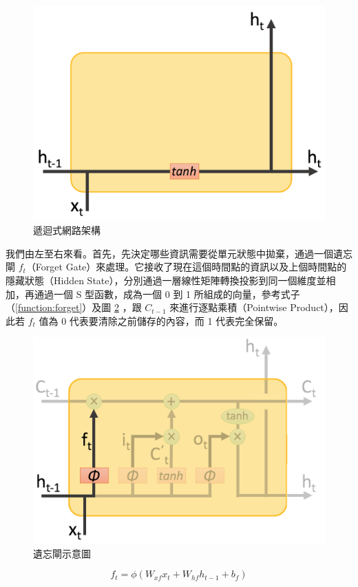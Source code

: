 \begin{figure}[h]
    \centering
    \includegraphics[scale=0.3]{images/chap2_rnnstruct.png}
    \caption{遞迴式網路架構}\label{fig:chap2_rnnA}
\end{figure}
我們由左至右來看。首先，先決定哪些資訊需要從單元狀態中拋棄，通過一個遺忘閘 $f_t$（Forget Gate）來處理。它接收了現在這個時間點的資訊以及上個時間點的隱藏狀態（Hidden State），分別通過一層線性矩陣轉換投影到同一個維度並相加，再通過一個 S 型函數，成為一個 0 到 1 所組成的向量，參考式子（\ref{function:forget}）及圖 \ref{fig:forget} ，跟 $C_{t-1}$ 來進行逐點乘積（Pointwise Product），因此若 $f_t$ 值為 0 代表要清除之前儲存的內容，而 1 代表完全保留。
\begin{figure}[h]
    \centering
    \includegraphics[scale=0.35]{images/chap2_forget.png}
    \caption{遺忘閘示意圖\cite{shen2016} }\label{fig:forget}
\end{figure}
\begin{equation}
    f_t = \phi(W_{xf}x_t + W_{hf}h_{t-1} + b_f) \label{function:forget}
\end{equation}

